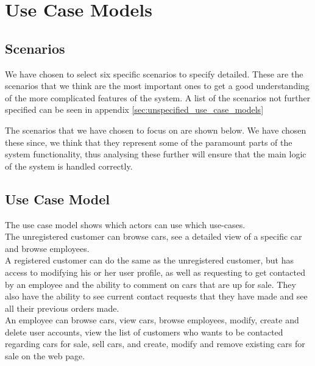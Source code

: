 \section{Use Case Models}

\subsection{Scenarios}
We have chosen to select six specific scenarios to specify detailed. These are the scenarios that we think are the most important ones to get a good understanding of the more complicated features of the system. A list of the scenarios not further specified can be seen in appendix \ref{sec:unspecified_use_case_models}

The scenarios that we have chosen to focus on are shown below. We have chosen these since, we think that they represent some of the paramount parts of the system functionality, thus analysing these further will ensure that the main logic of the system is handled correctly.













\subsection{Use Case Model}
The use case model shows which actors can use which use-cases.\\

The unregistered customer can browse cars, see a detailed view of a specific car and browse employees.\\
A registered customer can do the same as the unregistered customer, but has access to modifying his or her user profile, as well as requesting to get contacted by an employee and the ability to comment on cars that are up for sale.
They also have the ability to see current contact requests that they have made and see all their previous orders made.\\

An employee can browse cars, view cars, browse employees, modify, create and delete user accounts, view the list of customers who wants to be contacted regarding cars for sale, sell cars, and create, modify and remove existing cars for sale on the web page.\\

